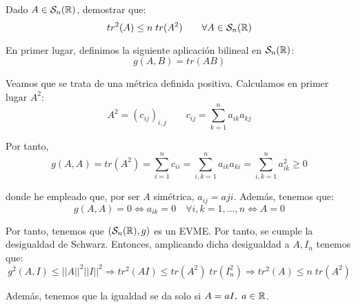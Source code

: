 \begin{ejercicio}
    Dado $A\in \mathcal{S}_n(\mathbb{R})$, demostrar que:
    \begin{equation*}
        tr^2(A) \leq n\;tr(A^2) \qquad \forall A\in \mathcal{S}_n(\mathbb{R})
    \end{equation*}

    En primer lugar, definimos la siguiente aplicación bilineal en $\mathcal{S}_n(\mathbb{R})$:
    \begin{equation*}
        g(A,B) = tr(AB)
    \end{equation*}

    Veamos que se trata de una métrica definida positiva. Calculamos en primer lugar $A^2$:
    \begin{equation*}
        A^2 = (c_{ij})_{i,j} \qquad c_{ij}=\sum_{k=1}^n a_{ik}a_{kj}
    \end{equation*}
    
    Por tanto,
    \begin{equation*}
        g(A,A) = tr(A^2) = \sum_{i=1}^n c_{ii} = \sum_{i,k=1}^n a_{ik}a_{ki}
        = \sum_{i,k=1}^n a_{ik}^2
        \geq 0
    \end{equation*}

    donde he empleado que, por ser $A$ simétrica, $a_{ij}=a{ji}$. Además, tenemos que: $$g(A,A)=0 \Longleftrightarrow a_{ik}=0 \quad \forall i,k=1,\dots, n\Longleftrightarrow A=0$$

    Por tanto, tenemos que $(\mathcal{S}_n(\mathbb{R}), g)$ es un EVME. Por tanto, se cumple la desigualdad de Schwarz. Entonces, amplicando dicha desigualdad a $A,I_n$ tenemos que:
    \begin{equation*}
        g^2(A,I) \leq ||A||^2 ||I||^2\Longrightarrow tr^2(AI) \leq tr(A^2)\;tr(I_n^2) \Longrightarrow tr^2(A)\leq n\;tr(A^2)
    \end{equation*}

    Además, tenemos que la igualdad se da solo si $A=aI,\;a\in \mathbb{R}$.
\end{ejercicio}


